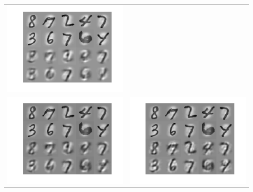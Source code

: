 \documentclass[paper=a4, fontsize=11pt]{scrartcl} %
\numberwithin{equation}{section} %
\numberwithin{figure}{section} %
\numberwithin{table}{section} %
\begin{document}
\begin{table}[H]
\begin{tabular}{cc}
	\includegraphics[scale=.3]{image_8}\\
	\includegraphics[scale=.3]{image_16}&
	\includegraphics[scale=.3]{image_32}\\

\end{tabular}
\end{table}
\end{document}
